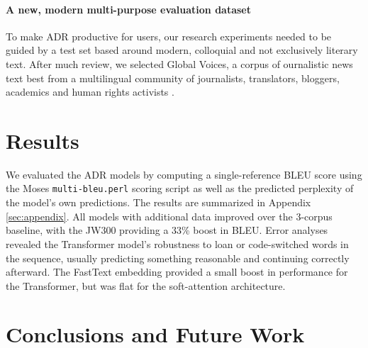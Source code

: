 \documentclass{article} %
\begin{document}
\paragraph{A new, modern multi-purpose evaluation dataset}\label{sec:evaldataset} To make ADR productive for users, our research experiments needed to be guided by a test set based around modern, colloquial and not exclusively literary text. After much review, we selected Global Voices, a corpus of ournalistic news text best from a multilingual community of journalists, translators, bloggers, academics and human rights activists \citep{global_voices}.



\section{Results}\label{sec:results}
We evaluated the ADR models by computing a single-reference BLEU score using the Moses \texttt{multi-bleu.perl} scoring script as well as the predicted perplexity of the model's own predictions. The results are summarized in Appendix \ref{sec:appendix}. All models with additional data improved over the 3-corpus baseline, with the JW300 providing a 33\% boost in BLEU. Error analyses revealed the Transformer model's robustness to loan or code-switched words in the sequence, usually predicting something reasonable and continuing correctly afterward. The FastText embedding provided a small boost in performance for the Transformer, but was flat for the soft-attention architecture. 
  
\section{Conclusions and Future Work}
\end{document}
